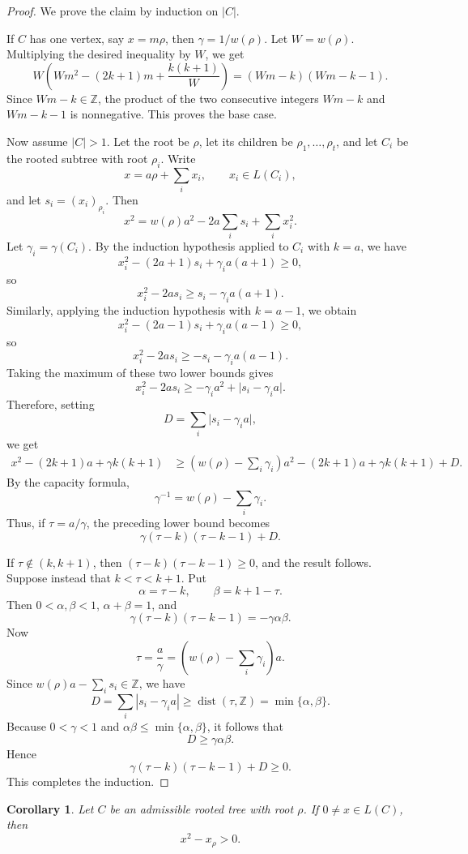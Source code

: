 \documentclass[12pt]{article}
\newtheorem{corollary}{Corollary}
\begin{document}
\begin{proof}
We prove the claim by induction on \(|C|\).

If \(C\) has one vertex, say \(x=m\rho\), then \(\gamma=1/w(\rho)\). Let \(W=w(\rho)\). Multiplying the desired inequality by \(W\), we get
\[
W\left(Wm^2-(2k+1)m+\frac{k(k+1)}{W}\right)
=
(Wm-k)(Wm-k-1).
\]
Since \(Wm-k\in\mathbb Z\), the product of the two consecutive integers \(Wm-k\) and \(Wm-k-1\) is nonnegative. This proves the base case.

Now assume \(|C|>1\). Let the root be \(\rho\), let its children be \(\rho_1,\dots,\rho_t\), and let \(C_i\) be the rooted subtree with root \(\rho_i\). Write
\[
x=a\rho+\sum_i x_i,
\qquad x_i\in L(C_i),
\]
and let \(s_i=(x_i)_{\rho_i}\). Then
\[
x^2=w(\rho)a^2-2a\sum_i s_i+\sum_i x_i^2.
\]
Let \(\gamma_i=\gamma(C_i)\). By the induction hypothesis applied to \(C_i\) with \(k=a\), we have
\[
x_i^2-(2a+1)s_i+\gamma_i a(a+1)\ge 0,
\]
so
\[
x_i^2-2as_i\ge s_i-\gamma_i a(a+1).
\]
Similarly, applying the induction hypothesis with \(k=a-1\), we obtain
\[
x_i^2-(2a-1)s_i+\gamma_i a(a-1)\ge 0,
\]
so
\[
x_i^2-2as_i\ge -s_i-\gamma_i a(a-1).
\]
Taking the maximum of these two lower bounds gives
\[
x_i^2-2as_i
\ge
-\gamma_i a^2+\bigl|s_i-\gamma_i a\bigr|.
\]
Therefore, setting
\[
D=\sum_i \bigl|s_i-\gamma_i a\bigr|,
\]
we get
\begin{align*}
x^2-(2k+1)a+\gamma k(k+1)
&\ge
\left(w(\rho)-\sum_i\gamma_i\right)a^2-(2k+1)a+\gamma k(k+1)+D.
\end{align*}
By the capacity formula,
\[
\gamma^{-1}=w(\rho)-\sum_i\gamma_i.
\]
Thus, if \(\tau=a/\gamma\), the preceding lower bound becomes
\[
\gamma(\tau-k)(\tau-k-1)+D.
\]

If \(\tau\notin(k,k+1)\), then \((\tau-k)(\tau-k-1)\ge 0\), and the result follows. Suppose instead that \(k<\tau<k+1\). Put
\[
\alpha=\tau-k,
\qquad
\beta=k+1-\tau.
\]
Then \(0<\alpha,\beta<1\), \(\alpha+\beta=1\), and
\[
\gamma(\tau-k)(\tau-k-1)=-\gamma\alpha\beta.
\]
Now
\[
\tau
=
\frac{a}{\gamma}
=
\left(w(\rho)-\sum_i\gamma_i\right)a.
\]
Since \(w(\rho)a-\sum_i s_i\in\mathbb Z\), we have
\[
D
=
\sum_i |s_i-\gamma_i a|
\ge
\operatorname{dist}(\tau,\mathbb Z)
=
\min\{\alpha,\beta\}.
\]
Because \(0<\gamma<1\) and \(\alpha\beta\le \min\{\alpha,\beta\}\), it follows that
\[
D\ge \gamma\alpha\beta.
\]
Hence
\[
\gamma(\tau-k)(\tau-k-1)+D\ge 0.
\]
This completes the induction.
\end{proof}

\begin{corollary}
Let \(C\) be an admissible rooted tree with root \(\rho\). If \(0\ne x\in L(C)\), then
\[
x^2-x_\rho>0.
\]
\end{corollary}
\end{document}
